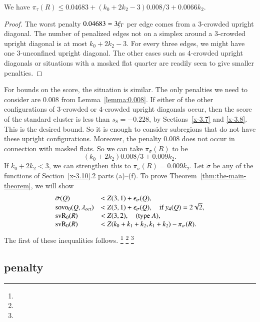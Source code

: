 \begin{lemma}
We have
    $\pi_\tau(R)\le 0.04683 + (k_0+2k_2-3)0.008/3 +0.0066k_2$.
\end{lemma}

\begin{proof}
The worst penalty $0.04683=3\xi_\Gamma$ per edge comes from a
$3$-crowded upright diagonal. The number of penalized edges not on
a simplex around a $3$-crowded upright diagonal is at most
$k_0+2k_2-3$. For every three edges, we might have one
$3$-unconfined upright diagonal. The other cases such as
$4$-crowded upright diagonals or situations with a masked flat
quarter are readily seen to give smaller penalties.
\end{proof}

For bounds on the score, the situation is similar.  The only
penalties we need to consider are $0.008$ from
Lemma~\ref{lemma:0.008}. If either of the other configurations of
$3$-crowded or $4$-crowded upright diagonals occur, then the score
of the standard cluster is less than $s_8=-0.228$, by
Sections~\ref{x-3.7} and \ref{x-3.8}. This is the desired bound.
So it is enough to consider subregions that do not have these
upright configurations. Moreover, the penalty $0.008$ does not
occur in connection with masked flats. So we can take
$\pi_\sigma(R)$ to be
    $$(k_0+2k_2)0.008/3 + 0.009 k_2.$$
If $k_0+2k_2<3$, we can strengthen this to
    $\pi_\sigma(R)=0.009 k_2$.
Let $\tilde\sigma$ be any of the functions of Section~\ref{x-3.10}.2
parts (a)--(f). To prove Theorem~\ref{thm:the-main-theorem}, we will
show
    \begin{equation}
    \begin{array}{lll}
    \tilde\sigma(Q)&< Z(3,1)+\epsilon_\sigma(Q),\\
    {\operatorname{sovo}}_0(Q,\lambda_{oct})
    &< Z(3,1)+\epsilon_\sigma(Q),\quad\text{if }y_4(Q)=2\sqrt2,\\
    {\operatorname{svR}}_0(R)&< Z(3,2),\quad\text{(type $A$)},\\
    {\operatorname{svR}}_0(R) &< Z(k_0+k_1+k_2,k_1+k_2) - \pi_\sigma(R).
    \label{eqn:sigma<Z(n,k)}
    \end{array}
    \end{equation}
The first of these inequalities follows.%
\footnote{} %
\footnote{} %
\footnote{} %


\subsection{penalty} %
\label{sec:4.2} \label{sec:penalty}

